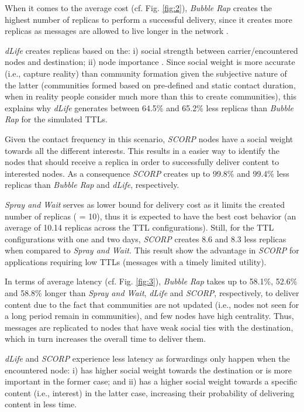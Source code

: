 \documentclass[lnicst]{svmultln}
\begin{document}
When it comes to the average cost (cf. Fig. \ref{fig:2}), \emph{Bubble
Rap} creates the highest number of replicas to perform a successful
delivery, since it creates more replicas as messages are allowed to
live longer in the network \cite{bubble2011}. 

\emph{dLife} creates replicas based on the: i) social strength between
carrier/encountered nodes and destination; ii) node importance \cite{dlife}.
Since social weight is more accurate (i.e., capture reality) than
community formation given the subjective nature of the latter (communities
formed based on pre-defined and static contact duration, when in reality
people consider much more than this to create communities), this explains
why \emph{dLife} generates between 64.5\% and 65.2\% less replicas
than \emph{Bubble Rap} for the simulated TTLs.

Given the contact frequency in this scenario, \emph{SCORP }nodes have
a social weight towards all the different interests. This results
in a easier way to identify the nodes that should receive a replica
in order to successfully deliver content to interested nodes. As a
consequence \emph{SCORP} creates up to 99.8\% and 99.4\% less replicas
than \emph{Bubble Rap} and \emph{dLife}, respectively. 

\emph{Spray and Wait }serves as lower bound for delivery cost as it
limits the created number of replicas ( = 10), thus it is expected
to have the best cost behavior (an average of 10.14 replicas across
the TTL configurations). Still, for the TTL configurations with one
and two days, \emph{SCORP} creates 8.6 and 8.3 less replicas when
compared to \emph{Spray and Wait.} This result show the advantage
in \emph{SCORP} for applications requiring low TTLs (messages with
a timely limited utility).

In terms of average latency (cf. Fig. \ref{fig:3}), \emph{Bubble
Rap} takes up to 58.1\%, 52.6\% and 58.8\% longer than \emph{Spray
and Wait},\emph{ dLife} and \emph{SCORP}, respectively, to deliver
content due to the fact that communities are not updated (i.e., nodes
not seen for a long period remain in communities), and few nodes have
high centrality. Thus, messages are replicated to nodes that have
weak social ties with the destination, which in turn increases the
overall time to deliver them.

\emph{dLife} and \emph{SCORP} experience less latency as forwardings
only happen when the encountered node: i) has higher social weight
towards the destination or is more important in the former case; and
ii) has a higher social weight towards a specific content (i.e., interest)
in the latter case, increasing their probability of delivering content
in less time. 
\end{document}

